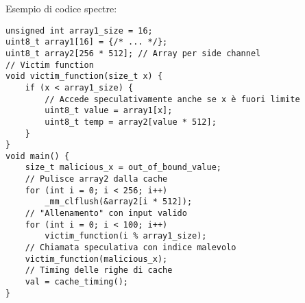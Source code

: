 Esempio di codice spectre:
\begin{verbatim}
unsigned int array1_size = 16;
uint8_t array1[16] = {/* ... */};
uint8_t array2[256 * 512]; // Array per side channel
// Victim function
void victim_function(size_t x) {
    if (x < array1_size) {
        // Accede speculativamente anche se x è fuori limite
        uint8_t value = array1[x];
        uint8_t temp = array2[value * 512];
    }
}
void main() {
    size_t malicious_x = out_of_bound_value;
    // Pulisce array2 dalla cache
    for (int i = 0; i < 256; i++)
        _mm_clflush(&array2[i * 512]);
    // "Allenamento" con input valido
    for (int i = 0; i < 100; i++)
        victim_function(i % array1_size);
    // Chiamata speculativa con indice malevolo
    victim_function(malicious_x);
    // Timing delle righe di cache
    val = cache_timing();
}
\end{verbatim}

